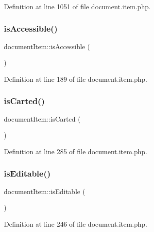 Definition at line 1051 of file document.\+item.\+php.

\hypertarget{classdocumentItem_a560fb40cd322ef5b8b3aa7d298730fcd}{}\label{classdocumentItem_a560fb40cd322ef5b8b3aa7d298730fcd} 
\subsubsection{\texorpdfstring{is\+Accessible()}{isAccessible()}}
{\footnotesize\ttfamily document\+Item\+::is\+Accessible (\begin{DoxyParamCaption}{ }\end{DoxyParamCaption})}



Definition at line 189 of file document.\+item.\+php.

\hypertarget{classdocumentItem_a505c87502da3ca4b656230125ffa4f1e}{}\label{classdocumentItem_a505c87502da3ca4b656230125ffa4f1e} 
\subsubsection{\texorpdfstring{is\+Carted()}{isCarted()}}
{\footnotesize\ttfamily document\+Item\+::is\+Carted (\begin{DoxyParamCaption}{ }\end{DoxyParamCaption})}



Definition at line 285 of file document.\+item.\+php.

\hypertarget{classdocumentItem_afb7ed54e828eeae6607328e285c7a8fe}{}\label{classdocumentItem_afb7ed54e828eeae6607328e285c7a8fe} 
\subsubsection{\texorpdfstring{is\+Editable()}{isEditable()}}
{\footnotesize\ttfamily document\+Item\+::is\+Editable (\begin{DoxyParamCaption}{ }\end{DoxyParamCaption})}



Definition at line 246 of file document.\+item.\+php.

